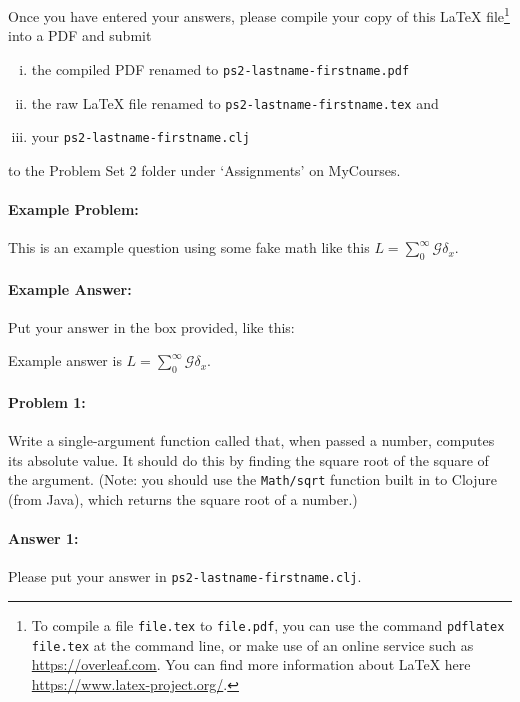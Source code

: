 \documentclass[10pt]{article}
\newenvironment{AnswerBox}{\begin{mdframed}[style=simple]}{\end{mdframed}}
\newcommand{\required}[1]{{\color{blue}{#1}}}
\newcommand{\PSnum}{2}
\begin{document}
Once you have entered your answers, please compile your copy of this \LaTeX{}
file\footnote{To compile a file \texttt{file.tex} to \texttt{file.pdf}, you can
  use the command \texttt{pdflatex file.tex} at the command line, or make use of
  an online service such as \url{https://overleaf.com}. You can find more
information about \LaTeX{} here \url{https://www.latex-project.org/}.} into a
PDF and submit
\begin{enumerate}[(i),noitemsep]
  \item the compiled PDF renamed to \texttt{ps\PSnum-lastname-firstname.pdf}
  \item the raw \LaTeX{} file renamed to
    \texttt{ps\PSnum-lastname-firstname.tex} and
  \item your \texttt{ps\PSnum-lastname-firstname.clj}
\end{enumerate}
to the Problem Set \PSnum{} folder under `Assignments' on MyCourses.

\noindent\hrulefill %

\paragraph{Example Problem:} This is an example question using some fake math
like this $L=\sum_0^{\infty} \mathcal{G} \delta_x$.

\paragraph{Example Answer:} Put your answer in the box provided, like this:
\begin{AnswerBox}
  Example answer is $L=\sum_0^{\infty} \mathcal{G} \delta_x$.
\end{AnswerBox}


\pagebreak%

\noindent\hrulefill

\paragraph{Problem 1:}
Write a single-argument function called \required{\texttt{absval}} that, when
passed a number,  computes its absolute value.  It should do this by finding the
square root of the square of the argument.  (Note: you should use the
\texttt{Math/sqrt} function built in to Clojure (from Java), which returns the
square root of a number.)

\paragraph{Answer 1:} Please put your answer in
\texttt{ps\PSnum-lastname-firstname.clj}.
\end{document}

